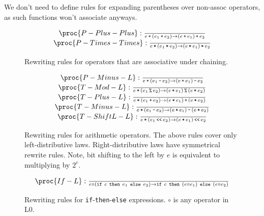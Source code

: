 We don't need to define rules for expanding parentheses over non-assoc
operators, as such functions won't associate anyways.

\begin{figure}[htbp!]
\[
\begin{matrix}
\proc{P-Plus-Plus}:{\over
e \lp \p{e_1 \lp e_2} \rightarrow \p{ e \lp e_1} \lp e_2
}\\
\proc{P-Times-Times}:{\over
e \lt \p{e_1\lt e_2} \rightarrow \p{e \lt e_1} \lt e_2
}\\
\end{matrix}
\]
\caption[]{Rewriting rules for operators that are associative under chaining.}
\label{figure:rewriting-chaining}
\end{figure}

\begin{figure*}[htbp!]
\[
\begin{matrix}
\proc{P-Minus-L}:{\over
e \lp \p{e_1 \lm e_2} \rightarrow \p{e \lp e_1 } \lm e_2
}\\
\proc{T-Mod-L}:{\over
e \lt \p{e_1 \lmod e_2}\rightarrow \p{ e \lt e_1 } \lmod \p{ e \lt e_2 }
}\\
\proc{T-Plus-L}:{\over
e \lt \p{e_1 \lp e_2} \rightarrow \p{ e \lt e_1 } \lp \p{ e \lt e_2 }
}\\
\proc{T-Minus-L}:{\over
e \lt \p{e_1 \lm e_2} \rightarrow \p{ e\lt e_1 } \lm \p{ e \lt e_2 }
}\\
\proc{T-ShiftL-L}:{\over
e \lt \p{e_1 \LBSL e_2} \rightarrow \p{ e \lt e_1 } \LBSL e_2
}
\end{matrix}
\]
\caption[]{Rewriting rules for arithmetic operators. The above rules cover only
left-distributive laws. Right-distributive laws have symmetrical rewrite rules.
Note, bit shifting to the left by $e$ is equivalent to multiplying by $2^e$.}
\label{figure:rewriting-arithop}
\end{figure*}

\begin{figure*}[htbp!]
\[
\begin{matrix}
\proc{If-L}:{\over
e \circ \p{\mathtt{if}\ c\ \mathtt{then}\ e_1\ \mathtt{else}\ e_2} \rightarrow
\mathtt{if}\ c\ \mathtt{then}\ \p{e \circ e_1} \ \mathtt{else}\ \p{e \circ e_2}
}\\
\end{matrix}
\]
\caption[]{Rewriting rules for \texttt{if}-\texttt{then}-\texttt{else}
expressions. $\circ$ is any operator in L0.}
\label{figure:rewriting-arithop}
\end{figure*}


